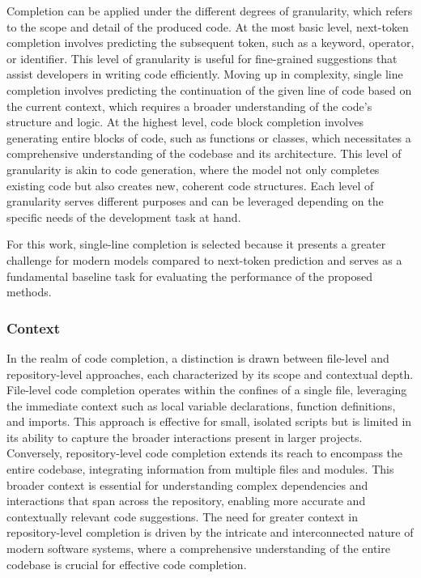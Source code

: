 Completion can be applied under the different degrees of granularity, which refers to the scope and detail of the produced code. At the most basic level, next-token completion involves predicting the subsequent token, such as a keyword, operator, or identifier. This level of granularity is useful for fine-grained suggestions that assist developers in writing code efficiently. Moving up in complexity, single line completion involves predicting the continuation of the given line of code based on the current context, which requires a broader understanding of the code's structure and logic. At the highest level, code block completion involves generating entire blocks of code, such as functions or classes, which necessitates a comprehensive understanding of the codebase and its architecture. This level of granularity is akin to code generation, where the model not only completes existing code but also creates new, coherent code structures. Each level of granularity serves different purposes and can be leveraged depending on the specific needs of the development task at hand.

For this work, single-line completion is selected because it presents a greater challenge for modern models compared to next-token prediction and serves as a fundamental baseline task for evaluating the performance of the proposed methods.

\subsubsection*{Context}

In the realm of code completion, a distinction is drawn between file-level and repository-level approaches, each characterized by its scope and contextual depth. File-level code completion operates within the confines of a single file, leveraging the immediate context such as local variable declarations, function definitions, and imports. This approach is effective for small, isolated scripts but is limited in its ability to capture the broader interactions present in larger projects. Conversely, repository-level code completion extends its reach to encompass the entire codebase, integrating information from multiple files and modules. This broader context is essential for understanding complex dependencies and interactions that span across the repository, enabling more accurate and contextually relevant code suggestions. The need for greater context in repository-level completion is driven by the intricate and interconnected nature of modern software systems, where a comprehensive understanding of the entire codebase is crucial for effective code completion.

